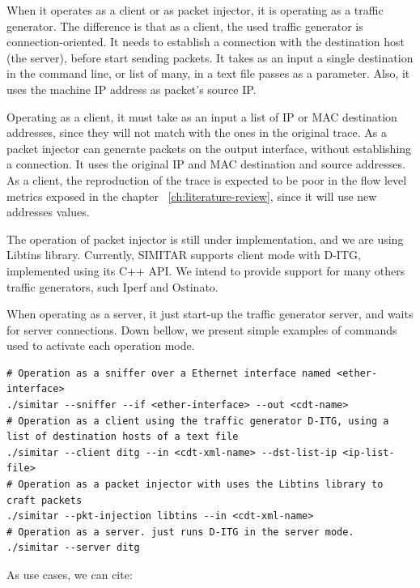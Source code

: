 When it operates as a client or as packet injector, it is operating as a traffic generator. The difference is that as a client, the used traffic generator is connection-oriented. It needs to establish a connection with the destination host (the server), before start sending packets. It takes as an input a single destination in the command line, or list of many, in a text file passes as a parameter. Also, it uses the machine IP address as packet's source IP.

Operating as a client, it must take as an input a list of IP or MAC destination addresses, since they will not match with the ones in the original trace. As a packet injector can generate packets on the output interface, without establishing a connection. It uses the original IP and MAC destination and source addresses. As a client, the reproduction of the trace is expected to be poor in the flow level metrics exposed in the chapter ~\ref{ch:literature-review}, since it will use new addresses values. 

The operation of packet injector is still under implementation, and we are using Libtins library. Currently, SIMITAR supports client mode with D-ITG, implemented using its C++ API. We intend to provide support for many others traffic generators, such Iperf and Ostinato.

When operating as a server, it just start-up the traffic generator server, and waits for server connections. Down bellow, we present simple examples of commands used to activate each operation mode.

\begin{verbatim}
# Operation as a sniffer over a Ethernet interface named <ether-interface> 
./simitar --sniffer --if <ether-interface> --out <cdt-name>
# Operation as a client using the traffic generator D-ITG, using a list of destination hosts of a text file
./simitar --client ditg --in <cdt-xml-name> --dst-list-ip <ip-list-file> 
# Operation as a packet injector with uses the Libtins library to craft packets
./simitar --pkt-injection libtins --in <cdt-xml-name> 
# Operation as a server. just runs D-ITG in the server mode.
./simitar --server ditg

\end{verbatim}

As use cases, we can cite:

